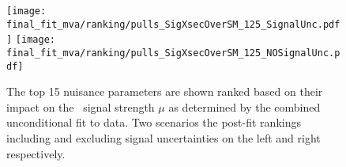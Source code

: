 \begin{figure}[ht]
  \centering
  \texttt{[image: final\_fit\_mva/ranking/pulls\_SigXsecOverSM\_125\_SignalUnc.pdf]}
  \texttt{[image: final\_fit\_mva/ranking/pulls\_SigXsecOverSM\_125\_NOSignalUnc.pdf]}
  \caption{The top 15 nuisance parameters are shown ranked based on their impact
  on the \VHbb\ signal strength $\mu$ as determined by the combined
  unconditional fit to data. Two scenarios the post-fit rankings including and
  excluding signal uncertainties on the left and right respectively.}
  \label{fig:Rank_012L_MVAVH}
\end{figure}